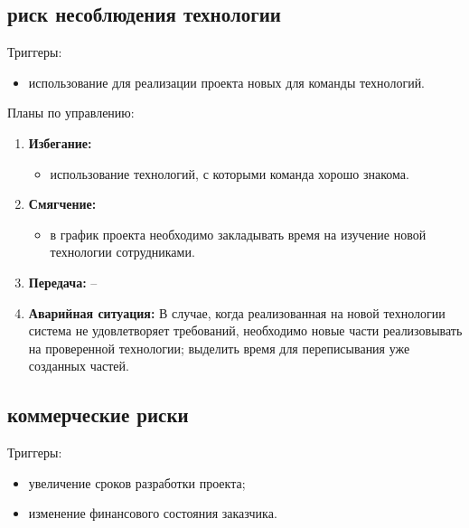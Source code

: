 \documentclass[a4paper,14pt]{extarticle}
\begin{document}
\subsection{риск несоблюдения технологии}
Триггеры:
\begin{itemize}
    \item использование для реализации проекта новых для команды технологий.
\end{itemize}

Планы по управлению:
\begin{enumerate}
    \item \textbf{Избегание:}
    \begin{itemize}
        \item использование технологий, с которыми команда хорошо знакома.
    \end{itemize}

    \item \textbf{Смягчение:}
    \begin{itemize}
        \item в график проекта необходимо закладывать время на изучение новой
              технологии сотрудниками.
    \end{itemize}

    \item \textbf{Передача:} --

    \item \textbf{Аварийная ситуация:} В случае, когда реализованная на новой
          технологии система не удовлетворяет требований, необходимо новые части
          реализовывать на проверенной технологии; выделить время для
          переписывания уже созданных частей.
\end{enumerate}

\subsection{коммерческие риски}
Триггеры:
\begin{itemize}
    \item увеличение сроков разработки проекта;
    \item изменение финансового состояния заказчика.
\end{itemize}
\end{document}
